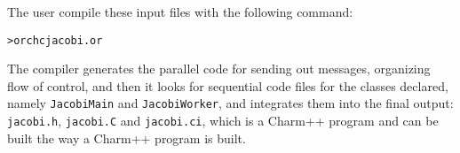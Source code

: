 \documentclass[10pt]{article}
\begin{document}
The user compile these input files with the following command:

\begin{alltt}
> orchc jacobi.or
\end{alltt}

The compiler generates the parallel code for sending out messages, organizing
flow of control, and then it looks for sequential code files for the classes
declared, namely {\tt JacobiMain} and {\tt JacobiWorker}, and integrates them
into the final output: {\tt jacobi.h}, {\tt jacobi.C} and {\tt jacobi.ci}, which
is a Charm++ program and can be built the way a Charm++ program is built.
\end{document}
